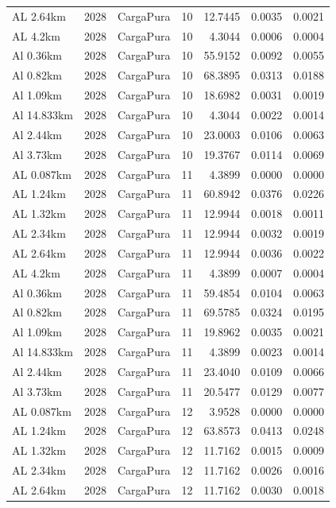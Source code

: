 \documentclass[11pt,a4paper]{article}
\begin{document}
\begin{longtable}{llllrrr}
AL 2.64km & 2028 & CargaPura & 10 & 12.7445 & 0.0035 & 0.0021 \\
AL 4.2km & 2028 & CargaPura & 10 & 4.3044 & 0.0006 & 0.0004 \\
Al 0.36km & 2028 & CargaPura & 10 & 55.9152 & 0.0092 & 0.0055 \\
Al 0.82km & 2028 & CargaPura & 10 & 68.3895 & 0.0313 & 0.0188 \\
Al 1.09km & 2028 & CargaPura & 10 & 18.6982 & 0.0031 & 0.0019 \\
Al 14.833km & 2028 & CargaPura & 10 & 4.3044 & 0.0022 & 0.0014 \\
Al 2.44km & 2028 & CargaPura & 10 & 23.0003 & 0.0106 & 0.0063 \\
Al 3.73km & 2028 & CargaPura & 10 & 19.3767 & 0.0114 & 0.0069 \\
AL 0.087km & 2028 & CargaPura & 11 & 4.3899 & 0.0000 & 0.0000 \\
AL 1.24km & 2028 & CargaPura & 11 & 60.8942 & 0.0376 & 0.0226 \\
AL 1.32km & 2028 & CargaPura & 11 & 12.9944 & 0.0018 & 0.0011 \\
AL 2.34km & 2028 & CargaPura & 11 & 12.9944 & 0.0032 & 0.0019 \\
AL 2.64km & 2028 & CargaPura & 11 & 12.9944 & 0.0036 & 0.0022 \\
AL 4.2km & 2028 & CargaPura & 11 & 4.3899 & 0.0007 & 0.0004 \\
Al 0.36km & 2028 & CargaPura & 11 & 59.4854 & 0.0104 & 0.0063 \\
Al 0.82km & 2028 & CargaPura & 11 & 69.5785 & 0.0324 & 0.0195 \\
Al 1.09km & 2028 & CargaPura & 11 & 19.8962 & 0.0035 & 0.0021 \\
Al 14.833km & 2028 & CargaPura & 11 & 4.3899 & 0.0023 & 0.0014 \\
Al 2.44km & 2028 & CargaPura & 11 & 23.4040 & 0.0109 & 0.0066 \\
Al 3.73km & 2028 & CargaPura & 11 & 20.5477 & 0.0129 & 0.0077 \\
AL 0.087km & 2028 & CargaPura & 12 & 3.9528 & 0.0000 & 0.0000 \\
AL 1.24km & 2028 & CargaPura & 12 & 63.8573 & 0.0413 & 0.0248 \\
AL 1.32km & 2028 & CargaPura & 12 & 11.7162 & 0.0015 & 0.0009 \\
AL 2.34km & 2028 & CargaPura & 12 & 11.7162 & 0.0026 & 0.0016 \\
AL 2.64km & 2028 & CargaPura & 12 & 11.7162 & 0.0030 & 0.0018 \\

\end{longtable}
\end{document}
